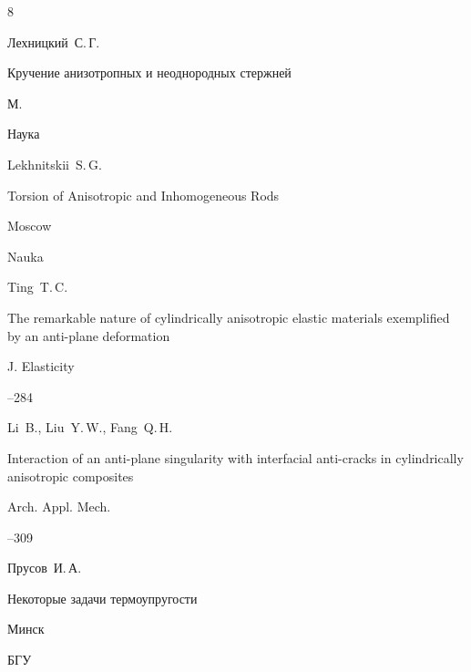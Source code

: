 \begin{thebibliography}{8}




\by Лехницкий~С.\,Г.

\book Кручение анизотропных и неоднородных стержней

\publaddr М.

\publ Наука



\misctransl

\by Lekhnitskii~S.\,G.

\book Torsion of Anisotropic and Inhomogeneous Rods

\publaddr Moscow

\publ Nauka






\by Ting~T.\,C.

\paper The remarkable nature of cylindrically anisotropic elastic materials exemplified by an anti-plane deformation

\jour J. Elasticity




--284




\by Li~B., Liu~Y.\,W., Fang~Q.\,H.

\paper Interaction of an anti-plane singularity with interfacial anti-cracks in cylindrically anisotropic composites 

\jour Arch. Appl. Mech.



--309





\by Прусов~И.\,А.

\book Некоторые задачи термоупругости

\publaddr Минск

\publ БГУ



\end{thebibliography}

